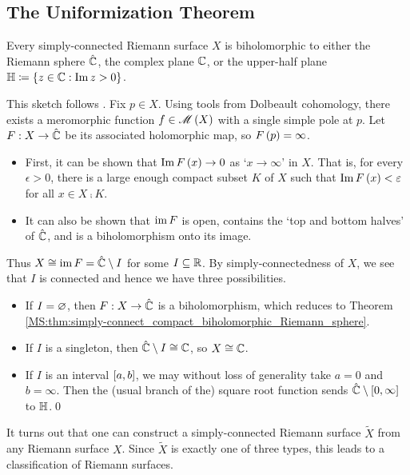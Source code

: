 \documentclass[../Moduli_Spaces_of_Riemann_Surfaces.tex]{subfiles}
\begin{document}
    \subsection{The Uniformization Theorem}
    \begin{theorem}[Uniformization]
        Every simply-connected Riemann surface $X$ is biholomorphic to either the Riemann sphere $\RS$, the complex plane $\C$, or the upper-half plane $\H\coloneqq\l\{z\in\C\st\Im z>0\r\}$.
    \end{theorem}
    \begin{proofsketch}
        This sketch follows \cite{peter}. Fix $p\in X$. Using tools from Dolbeault cohomology, there exists a meromorphic function $f\in\MERO\l(X\r)$ with a single simple pole at $p$. Let $F:X\to\RS$ be its associated holomorphic map, so $F\l(p\r)=\infty$.
        \begin{itemize}
            \item First, it can be shown that $\Im F\l(x\r)\to0$ as `$x\to\infty$' in $X$. That is, for every $\epsilon>0$, there is a large enough compact subset $K$ of $X$ such that $\Im F\l(x\r)<\epsilon$ for all $x\in X\comp K$.
                \vspace{-0.05in}
            \item It can also be shown that $\im F$ is open, contains the `top and bottom halves' of $\RS$, and is a biholomorphism onto its image.
        \end{itemize}
        Thus $X\iso\im F=\RS\comp I$ for some $I\subseteq\R$. By simply-connectedness of $X$, we see that $I$ is connected and hence we have three possibilities.
        \begin{itemize}
            \item If $I=\em$, then $F:X\to\RS$ is a biholomorphism, which reduces to Theorem \ref{MS:thm:simply-connect_compact_biholomorphic_Riemann_sphere}.
                \vspace{-0.05in}
            \item If $I$ is a singleton, then $\RS\comp I\iso\C$, so $X\iso\C$.
                \vspace{-0.05in}
            \item If $I$ is an interval $\l[a,b\r]$, we may without loss of generality take $a=0$ and $b=\infty$. Then the (usual branch of the) square root function sends $\RS\comp\l[0,\infty\r]$ to $\H$.\qed
        \end{itemize}
    \end{proofsketch}
    \begin{remark}
        It turns out that one can construct a simply-connected Riemann surface $\widetilde{X}$ from any Riemann surface $X$. Since $\widetilde{X}$ is exactly one of three types, this leads to a classification of Riemann surfaces.\exqed
    \end{remark}
\end{document}
